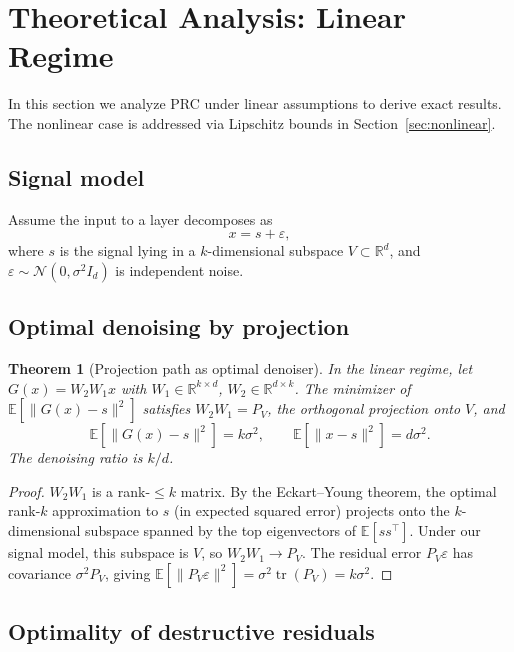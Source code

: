 \documentclass[11pt,a4paper]{article}
\newtheorem{theorem}{Theorem}[section]
\theoremstyle{definition}
\DeclareMathOperator{\tr}{tr}
\begin{document}
\section{Theoretical Analysis: Linear Regime}
\label{sec:linear-theory}

In this section we analyze PRC under linear assumptions to derive exact results.
The nonlinear case is addressed via Lipschitz bounds in Section~\ref{sec:nonlinear}.

\subsection{Signal model}

Assume the input to a layer decomposes as
\[
  x = s + \varepsilon,
\]
where $s$ is the signal lying in a $k$-dimensional subspace $V \subset \mathbb{R}^d$,
and $\varepsilon \sim \mathcal{N}(0, \sigma^2 I_d)$ is independent noise.

\subsection{Optimal denoising by projection}

\begin{theorem}[Projection path as optimal denoiser]
\label{thm:denoising}
In the linear regime, let $G(x) = W_2 W_1 x$ with $W_1 \in \mathbb{R}^{k \times d}$,
$W_2 \in \mathbb{R}^{d \times k}$. The minimizer of $\mathbb{E}[\|G(x) - s\|^2]$
satisfies $W_2 W_1 = P_V$, the orthogonal projection onto $V$, and
\[
  \mathbb{E}[\|G(x) - s\|^2] = k\sigma^2,
  \qquad
  \mathbb{E}[\|x - s\|^2] = d\sigma^2.
\]
The denoising ratio is $k/d$.
\end{theorem}

\begin{proof}
$W_2 W_1$ is a rank-$\leq k$ matrix. By the Eckart--Young theorem, the optimal
rank-$k$ approximation to $s$ (in expected squared error) projects onto the
$k$-dimensional subspace spanned by the top eigenvectors of $\mathbb{E}[ss^\top]$.
Under our signal model, this subspace is $V$, so $W_2 W_1 \to P_V$.
The residual error $P_V \varepsilon$ has covariance $\sigma^2 P_V$, giving
$\mathbb{E}[\|P_V \varepsilon\|^2] = \sigma^2 \tr(P_V) = k\sigma^2$.
\end{proof}

\subsection{Optimality of destructive residuals}
\end{document}
